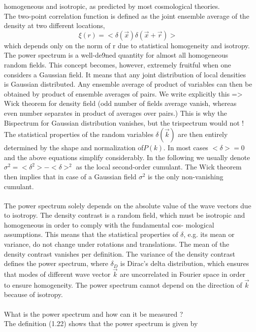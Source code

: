 \begin{description}
	homogeneous and isotropic, as predicted by most cosmological theories.\\
	The two-point correlation function is defined as the joint ensemble average of the density at two
	different locations,
	\begin{equation*}
	\xi(r) = <\delta(\vec{x}) \delta(\vec{x}+\vec{r})>
	\end{equation*}
	which depends only on the norm of r due to statistical homogeneity and isotropy. The power spectrum is a well-de9ned quantity for almost all homogeneous random fields. This
	concept becomes, however, extremely fruitful when one considers a Gaussian field. It means that
	any joint distribution of local densities is Gaussian distributed. Any ensemble average of product of
	variables can then be obtained by product of ensemble averages of pairs. We write explicitly this => Wick theorem for density field (odd number of fields average vanish, whereas even number separates in product of averages over pairs.)  This is why the Bispectrum for Gaussian distribution vanishes, but the trispectrum would not ! The statistical properties of the random variables $\delta(\vec{k})$ are then entirely determined by the shape and normalization of$ P(k)$.
	In most cases $<\delta>= 0$ and the above equations simplify considerably. In the following we usually
	denote $\sigma^2=<\delta^2> - <\delta>^2$ as the local second-order cumulant. The Wick theorem then implies that in case of a Gaussian
	field $\sigma^2$ is the only non-vanishing cumulant. \\
	\\The power spectrum solely depends on the absolute value of the wave vectors due to isotropy.
	The density contrast is a random field, which must be isotropic
	and homogeneous in order to comply with the fundamental cos-
	mological assumptions. This means that the statistical properties
	of $\delta$, e.g. its mean or variance, do not change under rotations and
	translations.
	The mean of the density contrast vanishes per definition.
	The variance of the density contrast defines the power spectrum, where $\delta_D$ is Dirac’s delta distribution, which ensures that modes of
	different wave vector $\vec{k}$ are uncorrelated in Fourier space in order
	to ensure homogeneity. The power spectrum cannot depend on the
	direction of $\vec{k}$ because of isotropy.\\
	\\
	What is the power spectrum and how can it be measured ?\\
	The definition (1.22) shows that the power spectrum is given by

\end{description}
